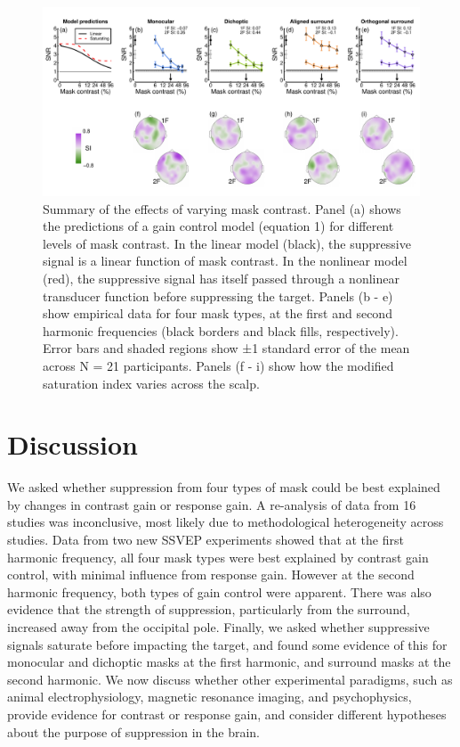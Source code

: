 \documentclass[]{article}
\begin{document}
\begin{figure}

{\centering \includegraphics{figures/masksignals} 

}

\caption{Summary of the effects of varying mask contrast. Panel (a) shows the predictions of a gain control model (equation 1) for different levels of mask contrast. In the linear model (black), the suppressive signal is a linear function of mask contrast. In the nonlinear model (red), the suppressive signal has itself passed through a nonlinear transducer function before suppressing the target. Panels (b - e) show empirical data for four mask types, at the first and second harmonic frequencies (black borders and black fills, respectively). Error bars and shaded regions show ±1 standard error of the mean across N = 21 participants. Panels (f - i) show how the modified saturation index varies across the scalp.}\label{fig:masksignals}
\end{figure}

\hypertarget{discussion}{%
\section{Discussion}\label{discussion}}

We asked whether suppression from four types of mask could be best explained by changes in contrast gain or response gain. A re-analysis of data from 16 studies was inconclusive, most likely due to methodological heterogeneity across studies. Data from two new SSVEP experiments showed that at the first harmonic frequency, all four mask types were best explained by contrast gain control, with minimal influence from response gain. However at the second harmonic frequency, both types of gain control were apparent. There was also evidence that the strength of suppression, particularly from the surround, increased away from the occipital pole. Finally, we asked whether suppressive signals saturate before impacting the target, and found some evidence of this for monocular and dichoptic masks at the first harmonic, and surround masks at the second harmonic. We now discuss whether other experimental paradigms, such as animal electrophysiology, magnetic resonance imaging, and psychophysics, provide evidence for contrast or response gain, and consider different hypotheses about the purpose of suppression in the brain.
\end{document}
